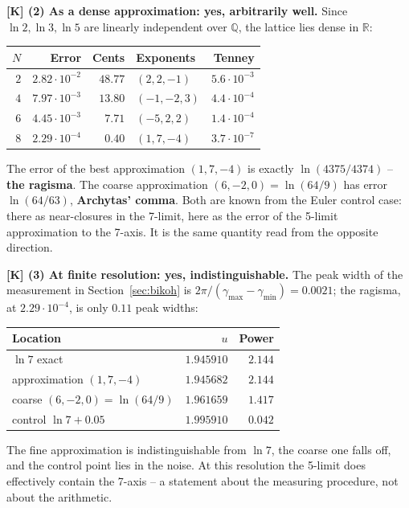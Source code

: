 \textbf{[K] (2) As a dense approximation: yes, arbitrarily well.} Since
$\ln2, \ln3, \ln5$ are linearly independent over $\mathbb{Q}$, the
lattice lies dense in $\mathbb{R}$:

\begin{center}
\begin{tabular}{rrrlr}
\toprule
$N$ & Error & Cents & Exponents & Tenney \\
\midrule
$2$ & $2.82\cdot10^{-2}$ & $48.77$ & $(2,2,-1)$ & $5.6\cdot10^{-3}$ \\
$4$ & $7.97\cdot10^{-3}$ & $13.80$ & $(-1,-2,3)$ & $4.4\cdot10^{-4}$ \\
$6$ & $4.45\cdot10^{-3}$ & $7.71$ & $(-5,2,2)$ & $1.4\cdot10^{-4}$ \\
$8$ & $2.29\cdot10^{-4}$ & $0.40$ & $(1,7,-4)$ & $3.7\cdot10^{-7}$ \\
\bottomrule
\end{tabular}
\end{center}

The error of the best approximation $(1,7,-4)$ is exactly
$\ln(4375/4374)$ -- \textbf{the ragisma}. The coarse approximation
$(6,-2,0) = \ln(64/9)$ has error $\ln(64/63)$, \textbf{Archytas'
comma}. Both are known from the Euler control case: there as
near-closures in the 7-limit, here as the error of the 5-limit
approximation to the 7-axis. It is the same quantity read from the
opposite direction.

\textbf{[K] (3) At finite resolution: yes, indistinguishable.} The peak
width of the measurement in Section~\ref{sec:bikoh} is
$2\pi/(\gamma_{\max}-\gamma_{\min}) = 0.0021$; the ragisma, at
$2.29\cdot10^{-4}$, is only $0.11$ peak widths:

\begin{center}
\begin{tabular}{lrr}
\toprule
Location & $u$ & Power \\
\midrule
$\ln 7$ exact & $1.945910$ & $2.144$ \\
approximation $(1,7,-4)$ & $1.945682$ & $2.144$ \\
coarse $(6,-2,0) = \ln(64/9)$ & $1.961659$ & $1.417$ \\
control $\ln 7 + 0.05$ & $1.995910$ & $0.042$ \\
\bottomrule
\end{tabular}
\end{center}

The fine approximation is indistinguishable from $\ln 7$, the coarse
one falls off, and the control point lies in the noise. At this
resolution the 5-limit does effectively contain the 7-axis -- a
statement about the measuring procedure, not about the arithmetic.

